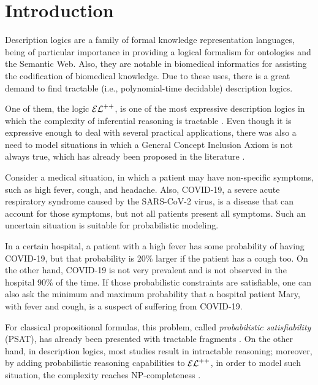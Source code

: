 
\chapter{Introduction}
\label{cap:introduction}
Description logics are a family of formal knowledge representation languages, being of particular importance in providing a logical formalism for ontologies and the Semantic Web. Also, they are notable in biomedical informatics for assisting the codification of biomedical knowledge. Due to these uses, there is a great demand to find tractable (i.e., polynomial-time decidable) description logics.

One of them, the logic $\mathcal{EL}^{++}$, is one of the most expressive description logics in which the complexity of inferential reasoning is tractable \citep{Baader2005a}. Even though it is expressive enough to deal with several practical applications, there was also a need to model situations in which a General Concept Inclusion Axiom is not always true, which has already been proposed in the literature \citep{boole1854investigation}.

\begin{example}
  \label{exmp:real-example}
Consider a medical situation, in which a patient may have non-specific symptoms, such as high fever, cough, and headache. Also, COVID-19, a severe acute respiratory syndrome caused by the  SARS-CoV-2 virus, is a disease that can account for those symptoms, but not all patients present all symptoms. Such an uncertain situation is suitable for probabilistic modeling.

In a certain hospital, a patient with a high fever has some probability of having COVID-19, but that probability is 20\% larger if the patient has a cough too. On the other hand, COVID-19 is not very prevalent and is not observed in the hospital 90\% of the time. If those probabilistic constraints are satisfiable, one can also ask the minimum and maximum probability that a hospital patient Mary, with fever and cough, is a suspect of suffering from COVID-19.
\end{example}

For classical propositional formulas, this problem, called \emph{probabilistic satisfiability} (PSAT), has already been presented with tractable fragments \citep{andersen2001easy}. On the other hand, in description logics, most studies result in intractable reasoning; moreover, by adding probabilistic reasoning capabilities to $\mathcal{EL}^{++}$, in order to model such situation, the complexity reaches NP-completeness \citep{Fin2019b}. 
    
